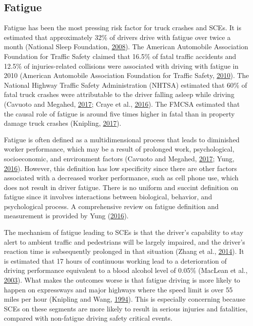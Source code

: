 \documentclass[12pt]{book}
\numberwithin{equation}{chapter}
\begin{document}
\hypertarget{fatigue}{%
\subsection{Fatigue}\label{fatigue}}

Fatigue has been the most pressing risk factor for truck crashes and SCEs. It is estimated that approximately 32\% of drivers drive with fatigue over twice a month (National Sleep Foundation, \protect\hyperlink{ref-nsleepf}{2008}). The American Automobile Association Foundation for Traffic Safety claimed that 16.5\% of fatal traffic accidents and 12.5\% of injuries-related collisions were associated with driving with fatigue in 2010 (American Automobile Association Foundation for Traffic Safety, \protect\hyperlink{ref-aaafoundation}{2010}). The National Highway Traffic Safety Administration (NHTSA) estimated that 60\% of fatal truck crashes were attributable to the driver falling asleep while driving (Cavuoto and Megahed, \protect\hyperlink{ref-cavuoto2017understanding}{2017}; Craye et al., \protect\hyperlink{ref-craye2016multi}{2016}). The FMCSA estimated that the causal role of fatigue is around five times higher in fatal than in property damage truck crashes (Knipling, \protect\hyperlink{ref-knipling2017threats}{2017}).

Fatigue is often defined as a multidimensional process that leads to diminished worker performance, which may be a result of prolonged work, psychological, socioeconomic, and environment factors (Cavuoto and Megahed, \protect\hyperlink{ref-cavuoto2017understanding}{2017}; Yung, \protect\hyperlink{ref-yung2016fatigue}{2016}). However, this definition has low specificity since there are other factors associated with a decreased worker performance, such as cell phone use, which does not result in driver fatigue. There is no uniform and succint definition on fatigue since it involves interactions between biological, behavior, and psychological process. A comprehensive review on fatigue definition and measurement is provided by Yung (\protect\hyperlink{ref-yung2016fatigue}{2016}).

The mechanism of fatigue leading to SCEs is that the driver's capability to stay alert to ambient traffic and pedestrians will be largely impaired, and the driver's reaction time is subsequently prolonged in that situation (Zhang et al., \protect\hyperlink{ref-zhang2014study}{2014}). It is estimated that 17 hours of continuous working lead to a deterioration of driving performance equivalent to a blood alcohol level of 0.05\% (MacLean et al., \protect\hyperlink{ref-maclean2003hazards}{2003}). What makes the outcomes worse is that fatigue driving is more likely to happen on expressways and major highways where the speed limit is over 55 miles per hour (Knipling and Wang, \protect\hyperlink{ref-knipling1994crashes}{1994}). This is especially concerning because SCEs on these segments are more likely to result in serious injuries and fatalities, compared with non-fatigue driving safety critical events.
\end{document}
